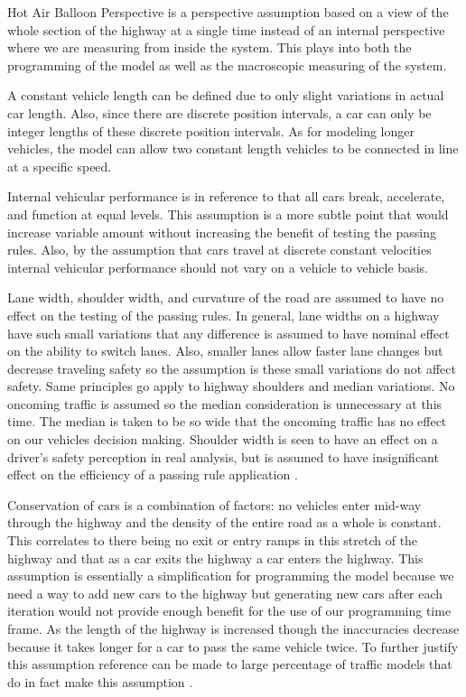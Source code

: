 \documentclass{amsart}
\begin{document}
		Hot Air Balloon Perspective is a perspective assumption based on a view of the whole section of the highway at a single time instead of an internal perspective where we are measuring from inside the system.  This plays into both the programming of the model as well as the macroscopic measuring of the system. 
		
		A constant vehicle length can be defined due to only slight variations in actual car length. Also, since there are discrete position intervals, a car can only be integer lengths of these discrete position intervals. As for modeling longer vehicles, the model can allow two constant length vehicles to be connected in line at a specific speed.

		Internal vehicular performance is in reference to that all cars break, accelerate, and function at equal levels.  This assumption is a more subtle point that would increase variable amount without increasing the benefit of testing the passing rules.  Also, by the assumption that cars travel at discrete constant velocities internal vehicular performance should not vary on a vehicle to vehicle basis. 

		Lane width, shoulder width, and curvature of the road are assumed to have no effect on the testing of the passing rules.  In general, lane widths on a highway have such small variations that any difference is assumed to have nominal effect on the ability to switch lanes.  Also, smaller lanes allow faster lane changes but decrease traveling safety so the assumption is these small variations do not affect safety. Same principles go apply to highway shoulders and median variations. No oncoming traffic is assumed so the median consideration is unnecessary at this time.  The median is taken to be so wide that the oncoming traffic has no effect on our vehicles decision making.  Shoulder width is seen to have an effect on a driver's safety perception in real analysis, but is assumed to have insignificant effect on the efficiency of a passing rule application \cite{elvik2009handbook}.
		 
		 Conservation of cars is a combination of factors: no vehicles enter mid-way through the highway and the density of the entire road as a whole is constant.  This correlates to there being no exit or entry ramps in this stretch of the highway and that as a car exits the highway a car enters the highway.  This assumption is essentially a simplification for programming the model because we need a way to add new cars to the highway but generating new cars after each iteration would not provide enough benefit for the use of our programming time frame. As the length of the highway is increased though the inaccuracies decrease because it takes longer for a car to pass the same vehicle twice.  To further justify this assumption reference can be made to large percentage of traffic models that do in fact make this assumption \cite{seiboldconstructing}.  
		 
\end{document}

